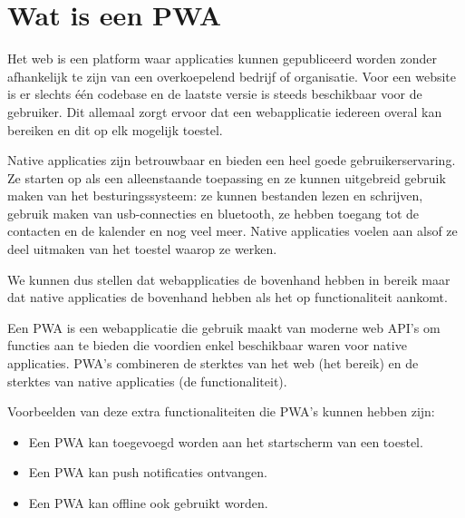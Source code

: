 
\section{Wat is een PWA}
\label{ch: Wat is een PWA}

Het web is een platform waar applicaties kunnen gepubliceerd worden zonder afhankelijk te zijn van een overkoepelend bedrijf of organisatie. Voor een website is er slechts één codebase en de laatste versie is steeds beschikbaar voor de gebruiker. 
Dit allemaal zorgt ervoor dat een webapplicatie iedereen overal kan bereiken en dit op elk mogelijk toestel.

Native applicaties zijn betrouwbaar en bieden een heel goede gebruikerservaring. Ze starten op als een alleenstaande toepassing en ze kunnen uitgebreid gebruik maken van het besturingssysteem: ze kunnen bestanden lezen en schrijven, gebruik maken van usb-connecties en bluetooth, ze hebben toegang tot de contacten en de kalender en nog veel meer. Native applicaties voelen aan alsof ze deel uitmaken van het toestel waarop ze werken.

We kunnen dus stellen dat webapplicaties de bovenhand hebben in bereik maar dat native applicaties de bovenhand hebben als het op functionaliteit aankomt.

Een PWA is een webapplicatie die gebruik maakt van moderne web API's om functies aan te bieden die voordien enkel beschikbaar waren voor native applicaties. PWA's combineren de sterktes van het web (het bereik) en de sterktes van native applicaties (de functionaliteit).
\autocite{Richard2020}
\autocite{Google2020}

Voorbeelden van deze extra functionaliteiten die PWA's kunnen hebben zijn: 

\begin{itemize}
	\item Een PWA kan toegevoegd worden aan het startscherm van een toestel.
	\item Een PWA kan push notificaties ontvangen.
	\item Een PWA kan offline ook gebruikt worden.
\end{itemize}

